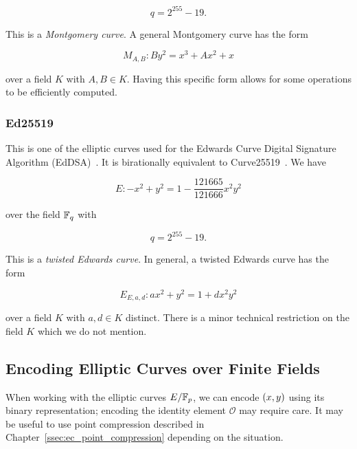 \begin{equation}
    q = 2^{255} - 19.
\end{equation}

\noindent
This is a \emph{Montgomery curve}.
A general Montgomery curve has the form

\begin{equation}
    M_{A,B}: By^{2} = x^{3} + Ax^{2} + x
\end{equation}

\noindent
over a field $K$ with $A,B\in K$.
Having this specific form allows for some operations to be
efficiently computed.

\subsubsection{Ed25519}

This is one of the \glspl{elliptic curve} used for the
Edwards Curve Digital Signature Algorithm (EdDSA)~\cite{ed25519}.
It is birationally equivalent to Curve25519~\cite{Curve25519}.
We have

\begin{equation}
    E:-x^{2} + y^{2} = 1 - \frac{121665}{121666}x^{2}y^{2}
\end{equation}

\noindent
over the \gls{field} $\mathbb{F}_{q}$ with

\begin{equation}
    q = 2^{255}-19.
\end{equation}

\noindent
This is a \emph{twisted Edwards curve}.
In general, a twisted Edwards curve has the form

\begin{equation}
    E_{E,a,d}:ax^{2} + y^{2} = 1 + dx^{2}y^{2}
\end{equation}

\noindent
over a field $K$ with $a,d\in K$ distinct.
There is a minor technical restriction on the field $K$
which we do not mention.

\subsection{Encoding Elliptic Curves over Finite Fields}

When working with the \glspl{elliptic curve} $E/\mathbb{F}_{p}$,
we can encode $\left( x,y \right)$ using its binary representation;
encoding the identity element $\mathcal{O}$ may require care.
It may be useful to use point compression described
in Chapter~\ref{ssec:ec_point_compression} depending on the situation.
